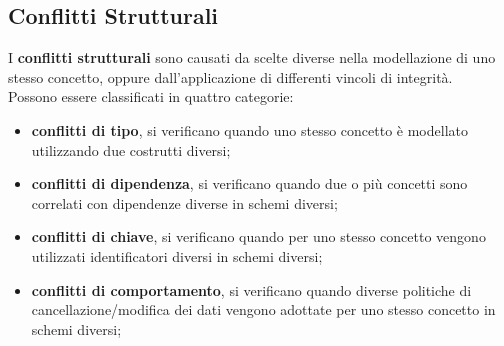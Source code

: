 \subsection{Conflitti Strutturali}\label{sub:db_conflitti_strutturali} %
I \textbf{conflitti strutturali} sono causati da scelte diverse nella modellazione di uno stesso concetto, oppure dall'applicazione di differenti vincoli di integrità.
\\
Possono essere classificati in quattro categorie:
\begin{itemize}
    \item \textbf{conflitti di tipo}, si verificano quando uno stesso concetto è modellato utilizzando due costrutti diversi;
    \item \textbf{conflitti di dipendenza}, si verificano quando due o più concetti sono correlati con dipendenze diverse in schemi diversi;
    \item \textbf{conflitti di chiave}, si verificano quando per uno stesso concetto vengono utilizzati identificatori diversi in schemi diversi;
    \item \textbf{conflitti di comportamento}, si verificano quando diverse politiche di cancellazione/modifica dei dati vengono adottate per uno stesso concetto in schemi diversi;
\end{itemize}
%
